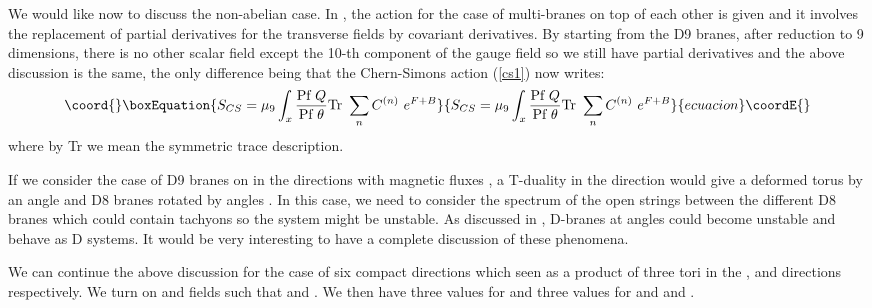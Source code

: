 \documentclass[a4paper,12pt]{article}
\begin{document}
We would like now to discuss the non-abelian case. In \cite{jm,mye1}, the
action for the case of multi-branes on top of each other is given and it
involves the replacement of partial derivatives for the transverse fields by
covariant derivatives. By starting from the D9 branes, after reduction to 9
dimensions, there is no other scalar field except the 10-th component of the
gauge field so we still have partial derivatives and the above discussion is
the same, the only difference being that the Chern-Simons action 
(\ref{cs1}) now writes:
\begin{equation}\coord{}\boxEquation{
\label{cs6}
 S_{CS} = \mu_9 \int_x {\mbox{Pf}~Q\over \mbox{Pf}~\theta}
\mbox{Tr}~\sum_n C^{(n)}~e^{F + B} 
}{
S_{CS} = \mu_9 \int_x {\mbox{Pf}~Q\over \mbox{Pf}~\theta}
\mbox{Tr}~\sum_n C^{(n)}~e^{F + B} 
}{ecuacion}\coordE{}\end{equation}
where by Tr we mean the symmetric trace description.

If we consider the case of \coordHE{} D9 branes on 
\coordHE{} in the \coordHE{} directions with magnetic fluxes 
\coordHE{}, a T-duality in the \coordHE{} direction would 
give a deformed \coordHE{} torus by an angle \coordHE{} and 
\coordHE{} D8 branes rotated by angles 
\coordHE{}.
In this case, we need to consider the spectrum of the open strings between the
different D8 branes which could contain tachyons so the system might be 
unstable. As discussed in \cite{chen,blu1}, D-branes at angles could become
unstable and behave as D \coordHE{} systems.
It would be very interesting to have a complete discussion of these
phenomena. 

We can continue the above discussion for the case of 
six compact directions which 
seen as a product of three tori \coordHE{} 
in the \coordHE{},
\coordHE{} and \coordHE{} directions respectively. 
We turn on \coordHE{} and \coordHE{} fields such that 
 \coordHE{} and
 \coordHE{} . We then have three values for
\coordHE{} and three values for \coordHE{} and \coordHE{} and
\coordHE{}. 
\end{document}
